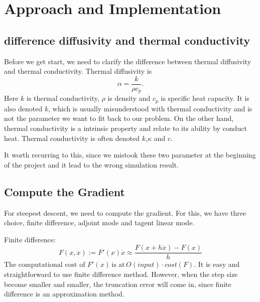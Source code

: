 \documentclass[10pt,a4paper]{report}
\begin{document}
\chapter{Approach and Implementation}
\section{difference diffusivity and thermal conductivity}


Before we get start, we need to clarify the difference between thermal diffusivity and thermal conductivity. Thermal diffusivity is \[\alpha = {\frac{k}{\rho c_p}}.\] Here $k$ is thermal conductivity, $\rho$ is density and $c_p$ is specific heat capacity. It is also denoted $k$, which is usually misunderstood with thermal conductivity and is not the parameter we want to fit back to our problem. On the other hand, thermal conductivity is a intrinsic property and relate to its ability by conduct heat. Thermal conductivity is often denoted $k$,$\kappa$ and $c$.   

It worth recurring to this, since we mistook these two parameter at the beginning of the project and it lead to the wrong simulation result.

\section{Compute the Gradient}
For steepest descent, we need to compute the gradient. For this, we have three choice, finite difference, adjoint mode and tagent linear mode. 

Finite difference:
\[F(x,\dot{x}):=F'(x)\dot{x}\approx {\frac{F(x+h\dot{x})-F(x)}{h}}\]
$\text{The computational cost of }F'(x)\, \text{is at} \, O(input) \cdot cost(F)$.
It is easy and straightforward to use finite difference method. However, when the step size become smaller and smaller, the truncation error will come in, since finite difference is an approximation method. 
\end{document}
